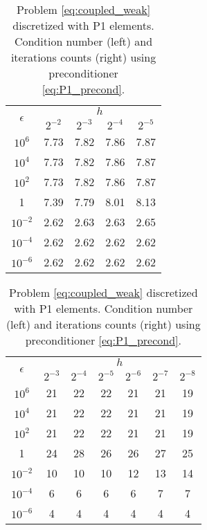 \documentclass[r]{siamart171218}
\begin{document}
\begin{table}
    \footnotesize{
      \begin{minipage}{0.49\textwidth}
          \begin{center}
            \begin{tabular}{c|cccc} \hline
              \multirow{2}{*}{$\epsilon$} & \multicolumn{4}{c}{$h$}\\
              \cline{2-5}
 &   $2^{-2}$  & $2^{-3}$ & $2^{-4}$ & $2^{-5}$   \\  
\hline
$10^{6}$ &	7.73&	7.82&	7.86&	7.87\\
$10^{4}$ &	7.73&	7.82&	7.86&	7.87\\
$10^{2}$   &	7.73&	7.82&	7.86&	7.87\\
1     &	7.39&	7.79&	8.01&	8.13\\
$10^{-2}$  &	2.62&	2.63&	2.63&	2.65\\
$10^{-4}$ &	2.62&	2.62&	2.62&	2.62\\
$10^{-6}$ &	2.62&	2.62&	2.62&	2.62\\
\hline
\end{tabular}
\end{center}
      \end{minipage}
    }
          \footnotesize{
            \begin{minipage}{0.49\textwidth}
              \begin{center}
            \begin{tabular}{c|cccccc} \hline
              \multirow{2}{*}{$\epsilon$} & \multicolumn{6}{c}{$h$}\\
              \cline{2-7}
 &   $2^{-3}$ & $2^{-4}$ & $2^{-5}$ & $2^{-6}$ & $2^{-7}$ & $2^{-8}$  \\  
              \hline
$10^{6}$ & 21 & 22 & 22 & 21 & 21 & 19\\
$10^{4}$ & 21 & 22 & 22 & 21 & 21 & 19\\
$10^{2}$ & 21 & 22 & 22 & 21 & 21 & 19\\
1 & 24 & 28 & 26 & 26 & 27 & 25\\
$10^{-2}$ & 10 & 10 & 10 & 12 & 13 & 14\\
$10^{-4}$ & 6 & 6 & 6 & 6 & 7 & 7\\
$10^{-6}$ & 4 & 4 & 4 & 4 & 4 & 4\\
\hline
\end{tabular}                
              \end{center}
        \end{minipage}
      }
          \caption{
            Problem \eqref{eq:coupled_weak} discretized with P1 elements.
            Condition number (left) and iterations counts (right) using
            preconditioner \eqref{eq:P1_precond}.
          }
          \label{tab:P1} 
\end{table}
\end{document}
